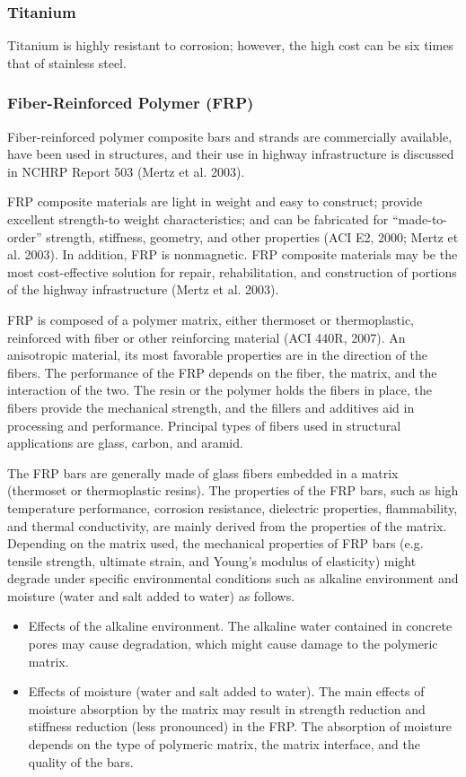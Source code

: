 \subsubsection{Titanium}

Titanium is highly resistant to corrosion; however, the high cost can be six times that of stainless steel.


\subsubsection{Fiber-Reinforced Polymer (FRP)}
Fiber-reinforced polymer composite bars and strands are commercially available, have been used in structures, and their use in highway infrastructure is discussed in NCHRP Report 503 (Mertz et al. 2003).

FRP composite materials are light in weight and easy to construct; provide excellent strength-to weight characteristics; and can be fabricated for “made-to-order” strength, stiffness, geometry, and other properties (ACI E2, 2000; Mertz et al. 2003). In addition, FRP is nonmagnetic. FRP composite materials may be the most cost-effective solution for repair, rehabilitation, and construction of portions of the highway infrastructure (Mertz et al. 2003).

FRP is composed of a polymer matrix, either thermoset or thermoplastic, reinforced with fiber or other reinforcing material (ACI 440R, 2007). An anisotropic material, its most favorable properties are in the direction of the fibers. The performance of the FRP depends on the fiber, the matrix, and the interaction of the two. The resin or the polymer holds the fibers in place, the fibers provide the mechanical strength, and the fillers and additives aid in processing and performance. Principal types of fibers used in structural applications are glass, carbon, and aramid.

The FRP bars are generally made of glass fibers embedded in a matrix (thermoset or thermoplastic resins). The properties of the FRP bars, such as high temperature performance, corrosion resistance, dielectric properties, flammability, and thermal conductivity, are mainly derived from the properties of the matrix. Depending on the matrix used, the mechanical properties of FRP bars (e.g. tensile strength, ultimate strain, and Young’s modulus of elasticity) might degrade under specific environmental conditions such as alkaline environment and moisture (water and salt added to water) as follows.

\begin{itemize}
  \item Effects of the alkaline environment. The alkaline water contained in concrete pores may cause degradation, which might cause damage to the polymeric matrix.
  \item Effects of moisture (water and salt added to water). The main effects of moisture absorption by the matrix may result in strength reduction and stiffness reduction (less pronounced) in the FRP. The absorption of moisture depends on the type of polymeric matrix, the matrix interface, and the quality of the bars.
\end{itemize}

